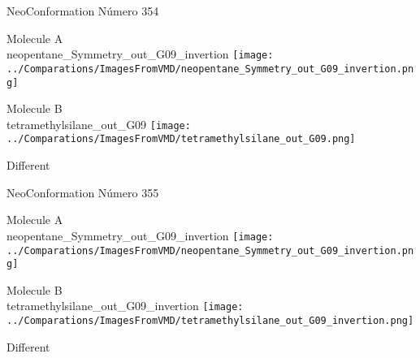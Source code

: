 \vtab[-2cm]
\begin{center}
{\large NeoConformation \tab Número 354}
\end{center}
\begin{multicols}{2}
\begin{center}
Molecule A \\ 
neopentane\_Symmetry\_out\_G09\_invertion
\texttt{[image: ../Comparations/ImagesFromVMD/neopentane\_Symmetry\_out\_G09\_invertion.png]}
\\
\vtab

\columnbreak
Molecule B \\ 
tetramethylsilane\_out\_G09
\texttt{[image: ../Comparations/ImagesFromVMD/tetramethylsilane\_out\_G09.png]}
\\
\vtab


\end{center}
\end{multicols}
\begin{center}
\vtab
\vtab
\textcolor{NavyBlue}{\Large Different}
\end{center}

 \newpage

\vtab[-2cm]
\begin{center}
{\large NeoConformation \tab Número 355}
\end{center}
\begin{multicols}{2}
\begin{center}
Molecule A \\ 
neopentane\_Symmetry\_out\_G09\_invertion
\texttt{[image: ../Comparations/ImagesFromVMD/neopentane\_Symmetry\_out\_G09\_invertion.png]}
\\
\vtab

\columnbreak
Molecule B \\ 
tetramethylsilane\_out\_G09\_invertion
\texttt{[image: ../Comparations/ImagesFromVMD/tetramethylsilane\_out\_G09\_invertion.png]}
\\
\vtab


\end{center}
\end{multicols}
\begin{center}
\vtab
\vtab
\textcolor{NavyBlue}{\Large Different}
\end{center}

 \newpage


